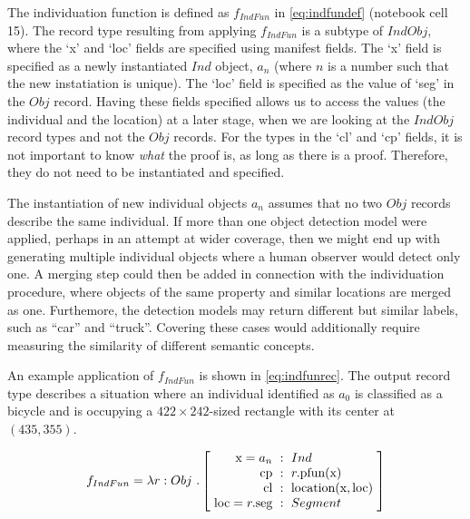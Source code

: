 The individuation function is defined as $f_{IndFun}$ in \autoref{eq:indfundef} (notebook cell 15).
The record type resulting from applying $f_{IndFun}$ is a subtype of $IndObj$, where the `x' and `loc' fields are specified using manifest fields.
The `x' field is specified as a newly instantiated $Ind$ object, $a_n$ (where $n$ is a number such that the new instatiation is unique).
The `loc' field is specified as the value of `seg' in the $Obj$ record.
Having these fields specified allows us to access the values (the individual and the location) at a later stage, when we are looking at the $IndObj$ record types and not the $Obj$ records.
For the types in the `cl' and `cp' fields, it is not important to know \textit{what} the proof is, as long as there is a proof.
Therefore, they do not need to be instantiated and specified.

The instantiation of new individual objects $a_n$ assumes that no two $Obj$ records describe the same individual.
If more than one object detection model were applied, perhaps in an attempt at wider coverage, then we might end up with generating multiple individual objects where a human observer would detect only one.
A merging step could then be added in connection with the individuation procedure, where objects of the same property and similar locations are merged as one.
Furthemore, the detection models may return different but similar labels, such as ``car'' and ``truck''.
Covering these cases would additionally require measuring the similarity of different semantic concepts.

An example application of $f_{IndFun}$ is shown in \autoref{eq:indfunrec}.
The output record type describes a situation where an individual identified as $a_0$ is classified as a bicycle and is occupying a $422 \times 242$-sized rectangle with its center at $(435, 355)$.

\begin{equation}\label{eq:indfundef}
f_{IndFun} = \lambda r : Obj\ . \rec{
    \text{x} = a_n &:& Ind \\
    \text{cp} &:& r.\text{pfun}(\text{x}) \\
    \text{cl} &:& \text{location}(\text{x}, \text{loc}) \\
    \text{loc} = r.\text{seg} &:& Segment\\
}
\end{equation}

